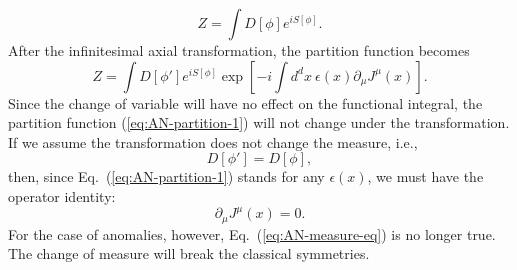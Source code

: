 \documentclass[aps,prb,superscriptaddress,nofootinbib]{revtex4}
\begin{document}
\begin{equation}
	Z = \int D[\phi] e^{iS[\phi]}.
\end{equation}
After the infinitesimal axial transformation, the partition function becomes
\begin{equation}\label{eq:AN-partition-1}
	Z = \int D[\phi'] e^{iS[\phi]} \exp\left[-i\int d^d x \ \epsilon(x) \partial_\mu J^\mu (x)\right].
\end{equation}
Since the change of variable will have no effect on the functional integral, the partition function (\ref{eq:AN-partition-1}) will not change under the transformation.
If we assume the transformation does not change the measure, i.e.,
\begin{equation}\label{eq:AN-measure-eq}
	D[\phi'] = D[\phi],
\end{equation}
then, since Eq.~(\ref{eq:AN-partition-1}) stands for any $\epsilon(x)$, we must have the operator identity:
\begin{equation}
	\partial_\mu J^\mu(x) = 0.
\end{equation}
For the case of anomalies, however, Eq.~(\ref{eq:AN-measure-eq}) is no longer true.
The change of measure will break the classical symmetries.

\tableofcontents
\end{document}
